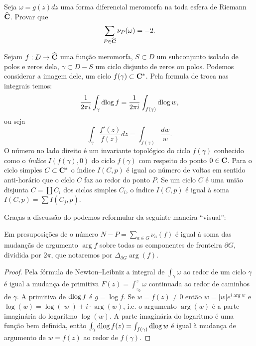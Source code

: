 \begin{problema}
Seja $\omega = g(z) dz$ uma forma diferencial meromorfa na toda esfera de Riemann $\widehat{\mathbf{C}}$.
Provar que
\begin{equation}
\label{eq:reciprocidade-valoracoes-formas}
\sum_{P\in\widehat{\mathbf{C}}} \nu_P(\omega) = -2.
\end{equation}
\end{problema}

\begin{prop}
\label{p:dlog-indice}
Sejam $f : D \to \widehat{\mathbf{C}}$ uma função meromorfa,
$S\subset D$ um subconjunto isolado de polos e zeros dela,
$\gamma \subset D - S$ um ciclo disjunto de zeros ou polos.
Podemos considerar a imagem dele, um ciclo $f(\gamma) \subset \mathbf{C}^*$.
Pela formula de troca nas integrais temos:
\begin{equation}
\frac{1}{2\pi i} \int_\gamma \operatorname{dlog} f = \frac{1}{2\pi i} \int_{f(\gamma)} \operatorname{dlog} w,
\end{equation}
ou seja
\[ \int_\gamma \frac{f'(z)}{f(z)} dz = \int_{f(\gamma)} \frac{dw}{w} .\] 
O número no lado direito é um invariante topológico do ciclo $f(\gamma)$
conhecido como o \emph{índice} $I(f(\gamma),0)$ do ciclo $f(\gamma)$ com respeito do ponto $0\in\mathbf{C}$.
Para o ciclo simples $C\subset\mathbf{C}^*$
o índice $I(C,p)$ é igual ao número de voltas em sentido anti-horário
que o cíclo $C$ faz ao redor do ponto $P$. Se um ciclo $C$ é uma união disjunta $C = \coprod C_i$
dos ciclos simples $C_i$, o índice $I(C,p)$ é igual à soma $I(C,p) = \sum I(C_j,p)$.
\end{prop}

Graças a discussão do 
podemos reformular  da seguinte maneira ``visual'':
\begin{teorema}
Em presuposições de  o número $N-P = \sum_{a\in G} \nu_a(f)$
é igual à soma das mudançãs de argumento $\arg f$ sobre todas as componentes de fronteira $\partial G$,
dividida por $2\pi$, que notaremos por $\Delta_{\partial G} \arg(f)$.
\end{teorema}
\begin{proof}
Pela fórmula de Newton--Leibniz a integral de $\int_\gamma \omega$ ao redor de um ciclo $\gamma$ é igual
a mudança de primitiva $F(z) = \int_{z_0}^z \omega$ continuada ao redor de caminhos de $\gamma$.
A primitiva de $\operatorname{dlog} f$ é $g=\log f$. Se $w=f(z)\neq0$ então $w = |w| e^{i\arg w}$
e $\log(w) = \log(|w|) + i\cdot \arg(w)$,
i.e. o argumento $\arg(w)$ é a parte imaginária do logaritmo $\log(w)$.
A parte imaginária do logaritmo é uma função bem definida, então
$\int_\gamma \operatorname{dlog} f(z) = \int_{f(\gamma)} \operatorname{dlog} w$
é igual à mudança de argumento de $w=f(z)$ ao redor de $f(\gamma)$.
\end{proof}

